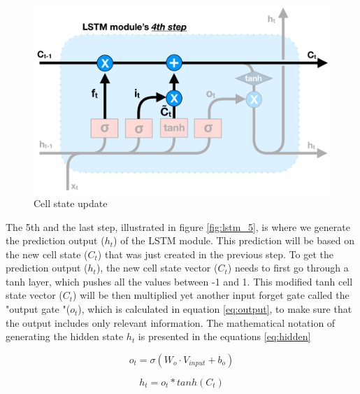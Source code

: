 \begin{figure}[h]
    \centering
    \includegraphics[width=12cm,height=\textheight,keepaspectratio]{lstm_4}
    \caption{Cell state update}
    \label{fig:lstm_4}
\end{figure}

The 5th and the last step, illustrated in figure \ref{fig:lstm_5}, is where we generate the prediction output ($h_t$) of the LSTM module. This prediction will be based on the new cell state ($C_t$) that was just created in the previous step. To get the prediction output ($h_t$), the new cell state vector ($C_t$) needs to first go through a tanh layer, which pushes all the values between -1 and 1. This modified tanh cell state vector ($C_t$) will be then multiplied yet another input forget gate called the "output gate "($o_t$), which is calculated in equation \ref{eq:output}, to make sure that the output includes only relevant information. The mathematical notation of generating the hidden state $h_t$ is presented in the equations \ref{eq:hidden}

\begin{equation} \label{eq:output}
    o_t = \sigma ( W_o \cdot V_{input} + b_o)
\end{equation}

\begin{equation} \label{eq:hidden}
    h_t = o_t * tanh(C_t)
\end{equation}

